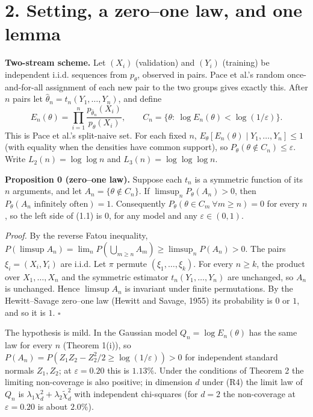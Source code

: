 \documentclass[
  10pt,
  a4paper,
]{article}
\begin{document}
\section{2. Setting, a zero--one law, and one
lemma}\label{setting-a-zeroone-law-and-one-lemma}

\textbf{Two-stream scheme.} Let \((X_i)\) (validation) and \((Y_i)\)
(training) be independent i.i.d. sequences from \(p_\theta\), observed
in pairs. Pace et al.'s random once-and-for-all assignment of each new
pair to the two groups gives exactly this. After \(n\) pairs let
\(\hat\theta_n=t_n(Y_1,\dots,Y_n)\), and define \[
E_n(\theta)=\prod_{i=1}^n\frac{p_{\hat\theta_n}(X_i)}{p_\theta(X_i)},\qquad
C_n=\{\theta:\ \log E_n(\theta)<\log(1/\varepsilon)\}.
\] This is Pace et al.'s split-naive set. For each fixed \(n\),
\(E_\theta[E_n(\theta)\mid Y_1,\dots,Y_n]\le1\) (with equality when the
densities have common support), so
\(P_\theta(\theta\notin C_n)\le\varepsilon\). Write
\(L_2(n)=\log\log n\) and \(L_3(n)=\log\log\log n\).

\textbf{Proposition 0 (zero--one law).} Suppose each \(t_n\) is a
symmetric function of its \(n\) arguments, and let
\(A_n=\{\theta\notin C_n\}\). If \(\limsup_nP_\theta(A_n)>0\), then
\(P_\theta(A_n\text{ infinitely often})=1\). Consequently
\(P_\theta(\theta\in C_m\ \forall m\ge n)=0\) for every \(n\), so the
left side of (1.1) is \(0\), for any model and any
\(\varepsilon\in(0,1)\).

\emph{Proof.} By the reverse Fatou inequality,
\(P(\limsup A_n)=\lim_nP(\bigcup_{m\ge n}A_m)\ge\limsup_nP(A_n)>0\). The
pairs \(\xi_i=(X_i,Y_i)\) are i.i.d. Let \(\pi\) permute
\((\xi_1,\dots,\xi_k)\). For every \(n\ge k\), the product over
\(X_1,\dots,X_n\) and the symmetric estimator \(t_n(Y_1,\dots,Y_n)\) are
unchanged, so \(A_n\) is unchanged. Hence \(\limsup A_n\) is invariant
under finite permutations. By the Hewitt--Savage zero--one law (Hewitt
and Savage, 1955) its probability is \(0\) or \(1\), and so it is \(1\).
\(\square\)

The hypothesis is mild. In the Gaussian model \(Q_n=\log E_n(\theta)\)
has the same law for every \(n\) (Theorem 1(i)), so
\(P(A_n)=P(Z_1Z_2-Z_2^2/2\ge\log(1/\varepsilon))>0\) for independent
standard normals \(Z_1,Z_2\); at \(\varepsilon=0.20\) this is
\(1.13\%\). Under the conditions of Theorem 2 the limiting non-coverage
is also positive; in dimension \(d\) under (R4) the limit law of \(Q_n\)
is \(\lambda_1\chi^2_d+\lambda_2\tilde\chi^2_d\) with independent
chi-squares (for \(d=2\) the non-coverage at \(\varepsilon=0.20\) is
about \(2.0\%\)).
\end{document}

